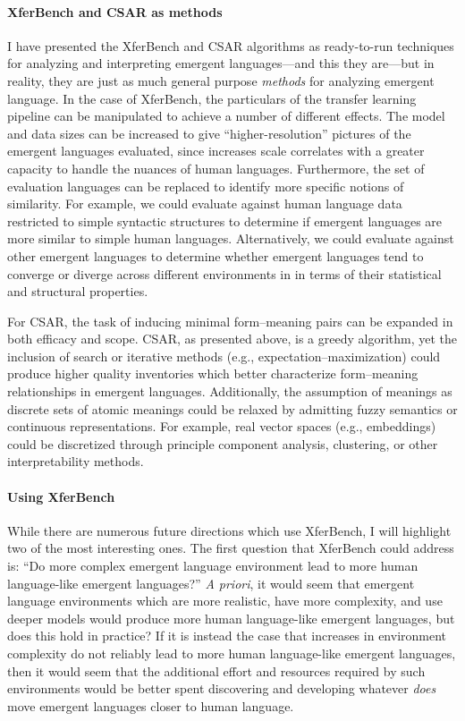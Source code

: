 \paragraph{XferBench and CSAR as methods}
I have presented the XferBench and CSAR algorithms as ready-to-run techniques for analyzing and interpreting emergent languages---and this they are---but in reality, they are just as much general purpose \emph{methods} for analyzing emergent language.
In the case of XferBench, the particulars of the transfer learning pipeline can be manipulated to achieve a number of different effects.
The model and data sizes can be increased to give ``higher-resolution'' pictures of the emergent languages evaluated, since increases scale correlates with a greater capacity to handle the nuances of human languages.
Furthermore, the set of evaluation languages can be replaced to identify more specific notions of similarity.
For example, we could evaluate against human language data restricted to simple syntactic structures to determine if emergent languages are more similar to simple human languages.
Alternatively, we could evaluate against other emergent languages to determine whether emergent languages tend to converge or diverge across different environments in in terms of their statistical and structural properties.

For CSAR, the task of inducing minimal form--meaning pairs can be expanded in both efficacy and scope.
CSAR, as presented above, is a greedy algorithm, yet the inclusion of search or iterative methods (e.g., expectation--maximization) could produce higher quality inventories which better characterize form--meaning relationships in emergent languages.
Additionally, the assumption of meanings as discrete sets of atomic meanings could be relaxed by admitting fuzzy semantics or continuous representations.
For example, real vector spaces (e.g., embeddings) could be discretized through principle component analysis, clustering, or other interpretability methods.


\paragraph{Using XferBench}
While there are numerous future directions which use XferBench, I will highlight two of the most interesting ones.
The first question that XferBench could address is:
  ``Do more complex emergent language environment lead to more human language-like emergent languages?''
\emph{A priori}, it would seem that emergent language environments which are more realistic, have more complexity, and use deeper models would produce more human language-like emergent languages, but does this hold in practice?
If it is instead the case that increases in environment complexity do not reliably lead to more human language-like emergent languages, then it would seem that the additional effort and resources required by such environments would be better spent discovering and developing whatever \emph{does} move emergent languages closer to human language.

